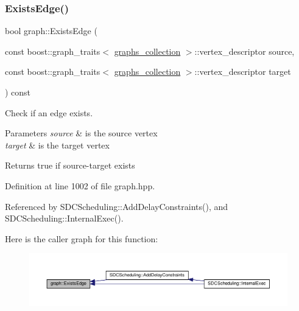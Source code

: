 \subsubsection{\texorpdfstring{Exists\+Edge()}{ExistsEdge()}}
{\footnotesize\ttfamily bool graph\+::\+Exists\+Edge (\begin{DoxyParamCaption}\item[{const boost\+::graph\+\_\+traits$<$ \hyperlink{structgraphs__collection}{graphs\+\_\+collection} $>$\+::vertex\+\_\+descriptor}]{source,  }\item[{const boost\+::graph\+\_\+traits$<$ \hyperlink{structgraphs__collection}{graphs\+\_\+collection} $>$\+::vertex\+\_\+descriptor}]{target }\end{DoxyParamCaption}) const\hspace{0.3cm}{\ttfamily [inline]}}



Check if an edge exists. 


\begin{DoxyParams}{Parameters}
{\em source} & is the source vertex \\
\hline
{\em target} & is the target vertex \\
\hline
\end{DoxyParams}
\begin{DoxyReturn}{Returns}
true if source-\/target exists 
\end{DoxyReturn}


Definition at line 1002 of file graph.\+hpp.



Referenced by S\+D\+C\+Scheduling\+::\+Add\+Delay\+Constraints(), and S\+D\+C\+Scheduling\+::\+Internal\+Exec().

Here is the caller graph for this function\+:
\nopagebreak
\begin{figure}[H]
\begin{center}
\leavevmode
\includegraphics[width=350pt]{d5/d15/structgraph_aff86ad7c5fb14a29be2013610985ef8e_icgraph}
\end{center}
\end{figure}
\mbox{\label{structgraph_a27f542404060a7ffa5ece86d7979a6c3}} 
